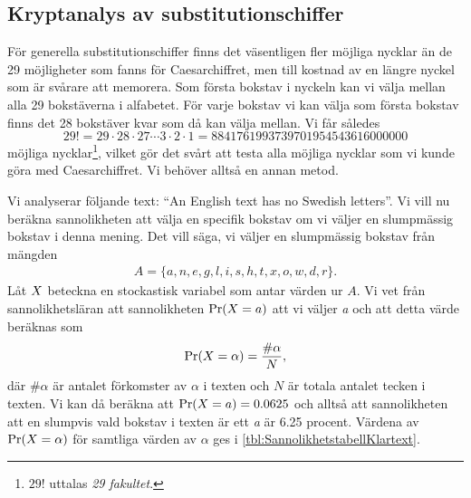 \subsection{Kryptanalys av substitutionschiffer}
\label{sec:KryptanalysSubstitution}
För generella substitutionschiffer finns det väsentligen fler möjliga nycklar 
än de 29 möjligheter som fanns för Caesarchiffret, men till kostnad av en 
längre nyckel som är svårare att memorera.
Som första bokstav i nyckeln kan vi välja mellan alla 29 bokstäverna i 
alfabetet.
För varje bokstav vi kan välja som första bokstav finns det 28 bokstäver kvar 
som då kan välja mellan.
Vi får således \[29! = 29\cdot 28\cdot 27\cdots 3\cdot 2\cdot 1 =
8841761993739701954543616000000\] möjliga nycklar\footnote{%
  \({29!}\) uttalas \emph{29 fakultet}.
}, vilket gör det svårt att testa alla möjliga nycklar som vi kunde göra med 
Caesarchiffret.
Vi behöver alltså en annan metod.

Vi analyserar följande text: \enquote{An English text has no Swedish letters}.
Vi vill nu beräkna sannolikheten att välja en specifik bokstav om vi väljer en 
slumpmässig bokstav i denna mening.
Det vill säga, vi väljer en slumpmässig bokstav från mängden
\begin{align}
  \nonumber
  A = \{a, n, e, g, l, i, s, h, t, x, o, w, d, r\}.
\end{align}
Låt \(\relax{X}\) beteckna en stockastisk variabel som antar värden ur \(A\).
Vi vet från sannolikhetsläran att sannolikheten \(\Pr(\relax{X} = a)\) att vi väljer 
\emph{a} och att detta värde beräknas som
\begin{equation}
  \nonumber
  \Pr(\relax{X} = \alpha) = \frac{\#\alpha}{N},
\end{equation}
där \(\#\alpha\) är antalet förkomster av \(\alpha\) i texten och \(N\) är 
totala antalet tecken i texten.
Vi kan då beräkna att \(\Pr(\relax{X} = a) = 0.0625\) och alltså att sannolikheten att 
en slumpvis vald bokstav i texten är ett \emph{a} är 6.25 procent.
Värdena av \(\Pr(\relax{X} = \alpha)\) för samtliga värden av \(\alpha\) ges 
i \cref{tbl:SannolikhetstabellKlartext}.

